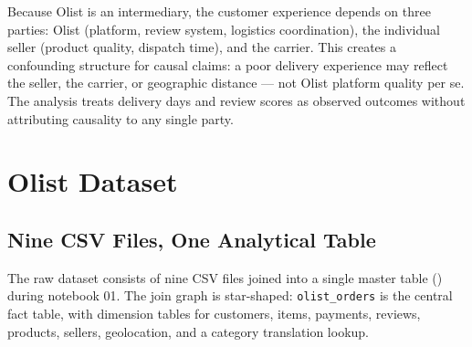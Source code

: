 Because Olist is an intermediary, the customer experience depends on three
parties: Olist (platform, review system, logistics coordination), the individual
seller (product quality, dispatch time), and the carrier. This creates a
confounding structure for causal claims: a poor delivery experience may reflect
the seller, the carrier, or geographic distance --- not Olist platform quality
per se. The analysis treats delivery days and review scores as observed outcomes
without attributing causality to any single party.

\section{Olist Dataset}
\label{sec:ecom-data}


\subsection{Nine CSV Files, One Analytical Table}

The raw dataset consists of nine CSV files joined into a single master table
() during notebook 01. The
join graph is star-shaped: \texttt{olist\_orders} is the central fact table,
with dimension tables for customers, items, payments, reviews, products, sellers,
geolocation, and a category translation lookup.

